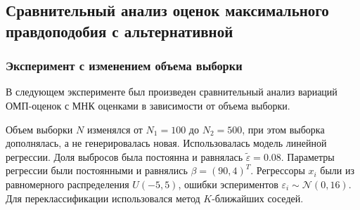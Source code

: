\subsection{Сравнительный анализ оценок максимального правдоподобия с альтернативной} \label{ss_4_6}
\subsubsection{Эксперимент с изменением объема выборки}
В следующем эксперименте был произведен сравнительный анализ вариаций ОМП-оценок с МНК оценками в зависимости от объема выборки.

Объем выборки $N$ изменялся от $N_1=100$ до $N_2=500$, при этом выборка дополнялась, а не генерировалась новая. Использовалась модель линейной регрессии. Доля выбросов была постоянна и равнялась $\widetilde{\varepsilon}=0.08$. Параметры регрессии были постоянными и равнялись $\beta=(90,4)^T$. 
Регрессоры $x_i$ были из равномерного распределения $U(-5,5)$, ошибки эспериментов $\varepsilon_i\sim \mathcal{N}(0,16)$. Для переклассификации использовался метод $K$-ближайших соседей.

